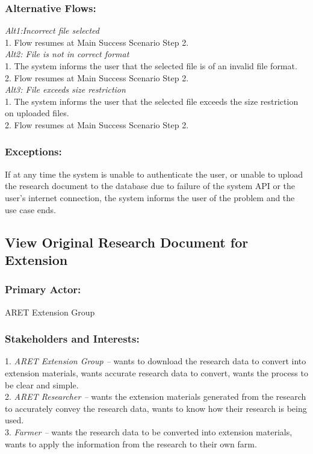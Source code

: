 \documentclass[12pt,letterpaper]{article}
\begin{document}
\subsubsection*{Alternative Flows:}
\emph{Alt1:Incorrect file selected}\\
1. Flow resumes at Main Success Scenario Step 2. \\[10pt]
\emph{Alt2: File is not in correct format}\\
1. The system informs the user that the selected file is of an invalid file format. \\
2. Flow resumes at Main Success Scenario Step 2. \\[10pt]
\emph{Alt3: File exceeds size restriction}\\
1. The system informs the user that the selected file exceeds the size restriction on uploaded files.\\
2. Flow resumes at Main Success Scenario Step 2.


\subsubsection*{Exceptions:}
If at any time the system is unable to authenticate the user, or unable to upload the research document to the database due to failure of the system API or the user’s internet connection, the system informs the user of the problem and the use case ends.


\clearpage
\subsection{View Original Research Document for Extension}
\subsubsection*{Primary Actor:} ARET Extension Group
\subsubsection*{Stakeholders and Interests:}
1. \emph{ARET Extension Group --} wants to download the research data to convert into extension materials, wants accurate research data to convert, wants the process to be clear and simple.\\[10pt]
2. \emph{ARET Researcher --} wants the extension materials generated from the research to accurately convey the research data, wants to know how their research is being used. \\[10pt]
3. \emph{Farmer --} wants the research data to be converted into extension materials, wants to apply the information from the research to their own farm.
\end{document}
